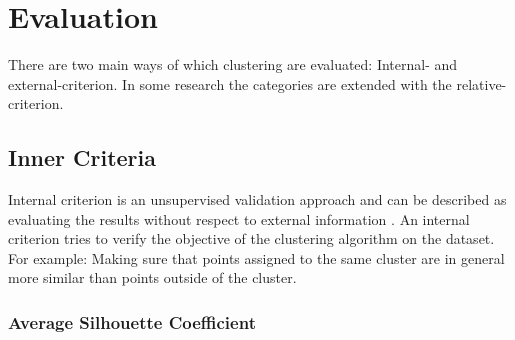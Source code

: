 \documentclass[../report.tex]{subfiles}
\begin{document}






\section{Evaluation}
There are two main ways of which clustering are evaluated: Internal- and external-criterion.\cite{manning2010introduction}
In some research the categories are extended with the relative-criterion.\cite{Halkidi2002}

\subsection{Inner Criteria} \label{sec:Internal}
Internal criterion is an unsupervised validation approach and can be described as evaluating the results without respect to external information \cite{Halkidi2002}. An internal criterion tries to verify the objective of the clustering algorithm on the dataset. For example: Making sure that points assigned to the same cluster are in general more similar than points outside of the cluster.

\subsubsection{Average Silhouette Coefficient}
\end{document}
